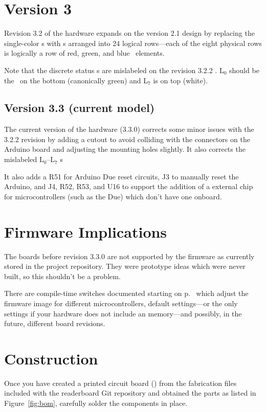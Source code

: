 \section{Version 3}
Revision 3.2 of the hardware expands on the version 2.1 design by replacing the single-color \led s with
 \led s arranged into 24 logical rows---each of the eight physical rows is logically a row of red,
green, and blue \led\ elements.

Note that the discrete status \led s are mislabeled on the revision 3.2.2 . L$_0$ should be the \led\
on the bottom (canonically green) and L$_7$ is on top (white).

\subsection{Version 3.3 (current model)}
The current version of the hardware (3.3.0) corrects some minor issues with the 3.2.2 revision by adding a cutout to avoid colliding with the
connectors on the Arduino board and adjusting the mounting holes slightly. It also corrects the mislabeled L$_0$--L$_7$ \led s

It also adds a R51 for Arduino Due reset circuits, J3 to manually reset the Arduino, and J4, R52, R53, and U16 to support the addition of a external
\acronym{EEPROM} chip for microcontrollers (such as the Due) which don't have one onboard.

\section{Firmware Implications}
The boards before  revision 3.3.0 are not supported by the firmware as currently stored in the project repository. They were prototype ideas
which were never built, so this shouldn't be a problem. 

There are compile-time switches documented starting on p.~\pageref{config-fw} which adjust the firmware
image for different microcontrollers, default settings---or the only settings if your hardware does not
include an \acronym{EEPROM} memory---and possibly, in the future, different board revisions.

\section{Construction}
Once you have created a printed circuit board () from the fabrication files included with the
readerboard Git repository and obtained the parts as listed in Figure~\ref{fig:bom}, carefully solder the components
in place. 

